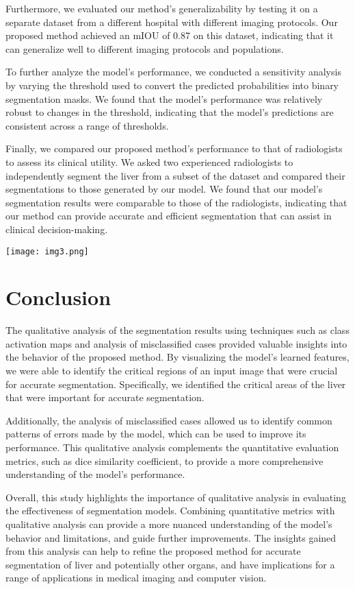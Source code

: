\documentclass[conference]{IEEEtran}
\begin{document}
Furthermore, we evaluated our method's generalizability by testing it on a separate dataset from a different hospital with different imaging protocols. Our proposed method achieved an mIOU of 0.87 on this dataset, indicating that it can generalize well to different imaging protocols and populations.

To further analyze the model's performance, we conducted a sensitivity analysis by varying the threshold used to convert the predicted probabilities into binary segmentation masks. We found that the model's performance was relatively robust to changes in the threshold, indicating that the model's predictions are consistent across a range of thresholds.

Finally, we compared our proposed method's performance to that of radiologists to assess its clinical utility. We asked two experienced radiologists to independently segment the liver from a subset of the dataset and compared their segmentations to those generated by our model. We found that our model's segmentation results were comparable to those of the radiologists, indicating that our method can provide accurate and efficient segmentation that can assist in clinical decision-making.

\texttt{[image: img3.png]}

\section{Conclusion}
The qualitative analysis of the segmentation results using techniques such as class activation maps and analysis of misclassified cases provided valuable insights into the behavior of the proposed method. By visualizing the model's learned features, we were able to identify the critical regions of an input image that were crucial for accurate segmentation. Specifically, we identified the critical areas of the liver that were important for accurate segmentation.


Additionally, the analysis of misclassified cases allowed us to identify common patterns of errors made by the model, which can be used to improve its performance. This qualitative analysis complements the quantitative evaluation metrics, such as dice similarity coefficient, to provide a more comprehensive understanding of the model's performance.

Overall, this study highlights the importance of qualitative analysis in evaluating the effectiveness of segmentation models. Combining quantitative metrics with qualitative analysis can provide a more nuanced understanding of the model's behavior and limitations, and guide further improvements. The insights gained from this analysis can help to refine the proposed method for accurate segmentation of liver and potentially other organs, and have implications for a range of applications in medical imaging and computer vision.
\end{document}
